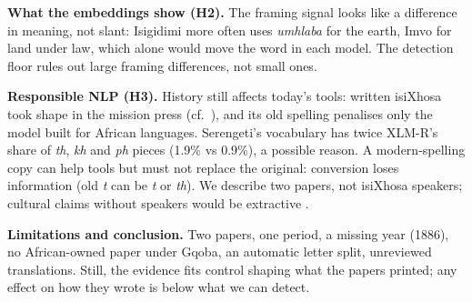\documentclass[10pt,letterpaper]{article}
\begin{document}
\textbf{What the embeddings show (H2).} The framing signal looks like a difference in meaning, not slant: Isigidimi more often uses \emph{umhlaba} for the earth, Imvo for land under law, which alone would move the word in each model. The detection floor rules out large framing differences, not small ones.

\textbf{Responsible NLP (H3).} History still affects today's tools: written isiXhosa took shape in the mission press (cf.\ \citealp{gilmour2007}), and its old spelling penalises only the model built for African languages. Serengeti's vocabulary has twice XLM-R's share of \emph{th}, \emph{kh} and \emph{ph} pieces (1.9\% vs 0.9\%), a possible reason. A modern-spelling copy can help tools but must not replace the original: conversion loses information (old \emph{t} can be \emph{t} or \emph{th}). We describe two papers, not isiXhosa speakers; cultural claims without speakers would be extractive \citep{bird2020}.

\textbf{Limitations and conclusion.} Two papers, one period, a missing year (1886), no African-owned paper under Gqoba, an automatic letter split, unreviewed translations. Still, the evidence fits control shaping what the papers printed; any effect on how they wrote is below what we can detect.


\setlength{\bibleftmargin}{.125in}
\setlength{\bibindent}{-\bibleftmargin}


\clearpage
\onecolumn
\small



\end{document}
